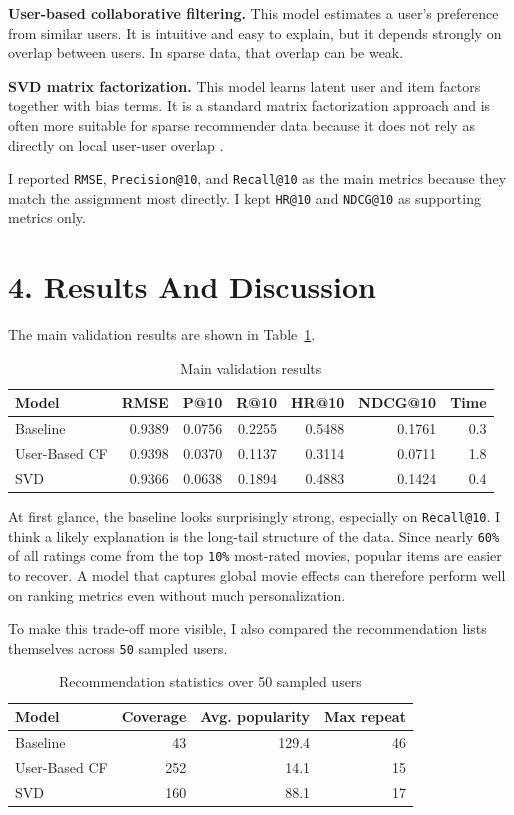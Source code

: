 \documentclass[10pt,a4paper]{article}
\begin{document}
\textbf{User-based collaborative filtering.} This model estimates a user's preference from similar users. It is intuitive and easy to explain, but it depends strongly on overlap between users. In sparse data, that overlap can be weak.

\textbf{SVD matrix factorization.} This model learns latent user and item factors together with bias terms. It is a standard matrix factorization approach and is often more suitable for sparse recommender data because it does not rely as directly on local user-user overlap \cite{koren2009,surprise-svd}.

I reported \texttt{RMSE}, \texttt{Precision@10}, and \texttt{Recall@10} as the main metrics because they match the assignment most directly. I kept \texttt{HR@10} and \texttt{NDCG@10} as supporting metrics only.

\section*{4. Results And Discussion}
The main validation results are shown in Table~\ref{tab:main-results}.

\begin{table}[H]
\centering
\caption{Main validation results}
\label{tab:main-results}
\small
\begin{tabular}{lrrrrrr}
\toprule
Model & RMSE & P@10 & R@10 & HR@10 & NDCG@10 & Time \\
\midrule
Baseline & 0.9389 & 0.0756 & 0.2255 & 0.5488 & 0.1761 & 0.3 \\
User-Based CF & 0.9398 & 0.0370 & 0.1137 & 0.3114 & 0.0711 & 1.8 \\
SVD & 0.9366 & 0.0638 & 0.1894 & 0.4883 & 0.1424 & 0.4 \\
\bottomrule
\end{tabular}
\end{table}

At first glance, the baseline looks surprisingly strong, especially on \texttt{Recall@10}. I think a likely explanation is the long-tail structure of the data. Since nearly \texttt{60\%} of all ratings come from the top \texttt{10\%} most-rated movies, popular items are easier to recover. A model that captures global movie effects can therefore perform well on ranking metrics even without much personalization.

To make this trade-off more visible, I also compared the recommendation lists themselves across \texttt{50} sampled users.

\begin{table}[H]
\centering
\caption{Recommendation statistics over 50 sampled users}
\small
\begin{tabular}{lrrr}
\toprule
Model & Coverage & Avg. popularity & Max repeat \\
\midrule
Baseline & 43 & 129.4 & 46 \\
User-Based CF & 252 & 14.1 & 15 \\
SVD & 160 & 88.1 & 17 \\
\bottomrule
\end{tabular}
\end{table}
\end{document}
